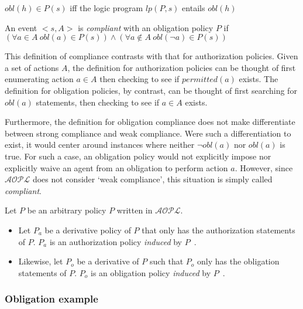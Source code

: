 \begin{definition}
    $obl(h) \in P(s)$ iff the logic program $lp(P, s)$ entails $obl(h)$
\end{definition}

\begin{definition}
    An event $<s, A>$ is \textit{compliant} with an obligation policy $P$ if $(\forall a \in A \ obl(a) \in P(s)) \land (\forall a \not \in A \ obl(\neg a) \in P(s))$
\end{definition}

This definition of compliance contrasts with that for authorization policies.
Given a set of actions $A$, the definition for authorization policies can be thought of first enumerating action $a \in A$ then checking to see if $permitted(a)$ exists.
The definition for obligation policies, by contrast, can be thought of first searching for $obl(a)$ statements, then checking to see if $a \in A$ exists.

Furthermore, the definition for obligation compliance does not make differentiate between strong compliance and weak compliance.
Were such a differentiation to exist, it would center around instances where neither $\neg obl(a)$ nor $obl(a)$ is true.
For such a case, an obligation policy would not explicitly impose nor explicitly waive an agent from an obligation to perform action $a$.
However, since $\mathcal{AOPL}$ does not consider `weak compliance', this situation is simply called \textit{compliant}.

\begin{definition}
    Let $P$ be an arbitrary policy $P$ written in $\mathcal{AOPL}$.

    \begin{itemize}
        \item Let $P_a$ be a derivative policy of $P$ that only has the authorization statements of $P$.
            $P_a$ is an authorization policy \textit{induced} by $P$~\citep{gelfond_authorization_2008}.
        \item Likewise, let $P_o$ be a derivative of $P$ such that $P_o$ only has the obligation statements of $P$.
            $P_o$ is an obligation policy \textit{induced} by $P$~\citep{gelfond_authorization_2008}.
    \end{itemize}
\end{definition}

\subsubsection{Obligation example}

